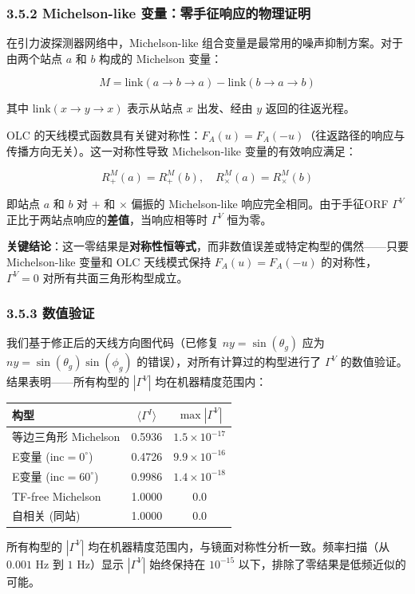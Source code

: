 \documentclass[12pt,a4paper]{article}
\begin{document}
\subsubsection{3.5.2 Michelson-like 变量：零手征响应的物理证明}

在引力波探测器网络中，Michelson-like 组合变量是最常用的噪声抑制方案。对于由两个站点 $a$ 和 $b$ 构成的 Michelson 变量：

$$M = \text{link}(a \to b \to a) - \text{link}(b \to a \to b)$$

其中 $\text{link}(x \to y \to x)$ 表示从站点 $x$ 出发、经由 $y$ 返回的往返光程。

OLC 的天线模式函数具有关键对称性：$F_A(u) = F_A(-u)$（往返路径的响应与传播方向无关）。这一对称性导致 Michelson-like 变量的有效响应满足：

$$R_+^M(a) = R_+^M(b), \quad R_\times^M(a) = R_\times^M(b)$$

即站点 $a$ 和 $b$ 对 $+$ 和 $\times$ 偏振的 Michelson-like 响应完全相同。由于手征ORF $\Gamma^V$ 正比于两站点响应的\textbf{差值}，当响应相等时 $\Gamma^V$ 恒为零。

\textbf{关键结论}：这一零结果是\textbf{对称性恒等式}，而非数值误差或特定构型的偶然——只要 Michelson-like 变量和 OLC 天线模式保持 $F_A(u) = F_A(-u)$ 的对称性，$\Gamma^V = 0$ 对所有共面三角形构型成立。

\subsubsection{3.5.3 数值验证}

我们基于修正后的天线方向图代码（已修复 $ny = \sin(\theta_g)$ 应为 $ny = \sin(\theta_g)\sin(\phi_g)$ 的错误），对所有计算过的构型进行了 $\Gamma^V$ 的数值验证。结果表明——所有构型的 $|\Gamma^V|$ 均在机器精度范围内：

\begin{tabular}{|l|c|c|}
\hline
构型 & $\langle\Gamma^I\rangle$ & $\max|\Gamma^V|$ \\
\hline
等边三角形 Michelson & 0.5936 & $1.5 \times 10^{-17}$ \\
E变量 (inc$=0^\circ$) & 0.4726 & $9.9 \times 10^{-16}$ \\
E变量 (inc$=60^\circ$) & 0.9986 & $1.4 \times 10^{-18}$ \\
TF-free Michelson & 1.0000 & $0.0$ \\
自相关 (同站) & 1.0000 & $0.0$ \\
\hline
\end{tabular}

所有构型的 $|\Gamma^V|$ 均在机器精度范围内，与镜面对称性分析一致。频率扫描（从 $0.001$ Hz 到 $1$ Hz）显示 $|\Gamma^V|$ 始终保持在 $10^{-15}$ 以下，排除了零结果是低频近似的可能。
\end{document}
